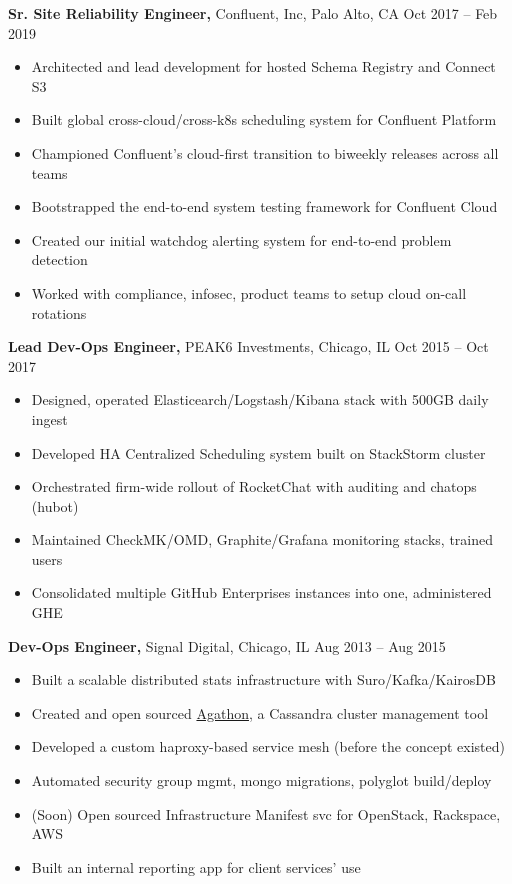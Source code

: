 \documentclass[margin]{res}
\begin{document}
\begin{resume}
{\bf Sr. Site Reliability Engineer,} Confluent, Inc, Palo Alto, CA \hfill Oct 2017 -- Feb 2019
\begin{itemize} \itemsep -2pt  %
  \item Architected and lead development for hosted Schema Registry and Connect S3
  \item Built global cross-cloud/cross-k8s scheduling system for Confluent Platform
  \item Championed Confluent's cloud-first transition to biweekly releases across all teams
  \item Bootstrapped the end-to-end system testing framework for Confluent Cloud
  \item Created our initial watchdog alerting system for end-to-end problem detection
  \item Worked with compliance, infosec, product teams to setup cloud on-call rotations
 \end{itemize}

{\bf Lead Dev-Ops Engineer,} PEAK6 Investments, Chicago, IL \hfill Oct 2015 -- Oct 2017
\begin{itemize} \itemsep -2pt  %
  \item Designed, operated Elasticearch/Logstash/Kibana stack with 500GB daily ingest
  \item Developed HA Centralized Scheduling system built on StackStorm cluster
  \item Orchestrated firm-wide rollout of RocketChat with auditing and chatops (hubot)
  \item Maintained CheckMK/OMD, Graphite/Grafana monitoring stacks, trained users
  \item Consolidated multiple GitHub Enterprises instances into one, administered GHE
 \end{itemize}

{\bf Dev-Ops Engineer,} Signal Digital, Chicago, IL \hfill Aug 2013 -- Aug 2015
\begin{itemize} \itemsep -2pt  %
  \item Built a scalable distributed stats infrastructure with Suro/Kafka/KairosDB
  \item Created and open sourced \href{https://github.com/brighttag/agathon}{Agathon}, a Cassandra cluster management tool
  \item Developed a custom haproxy-based service mesh (before the concept existed)
  \item Automated security group mgmt, mongo migrations, polyglot build/deploy
  \item (Soon) Open sourced Infrastructure Manifest svc for OpenStack, Rackspace, AWS
  \item Built an internal reporting app for client services' use
 \end{itemize}


\end{resume}
\end{document}
